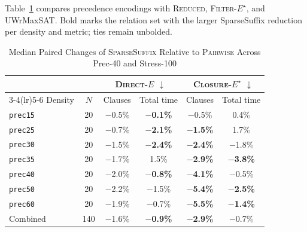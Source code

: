 \documentclass[conference,a4paper]{IEEEtran}
\newcommand{\revised}[1]{#1}
\begin{document}
\revised{Table~\ref{tab:precedence} compares precedence encodings with \mbox{\textsc{Reduced}}, \mbox{\textsc{Filter-}$E^\star$}, and UWrMaxSAT. Bold marks the relation set with the larger SparseSuffix reduction per density and metric; ties remain unbolded.}
\begin{table}[t]
\caption{Median Paired Changes of \mbox{\textnormal{\textsc{SparseSuffix}}} Relative to \mbox{\textnormal{\textsc{Pairwise}}}
Across Prec-40 and Stress-100}
\label{tab:precedence}
\centering
\scriptsize
\setlength{\tabcolsep}{1.3pt}
\begin{tabular}{@{}lccccc@{}}
\toprule
& & \multicolumn{2}{c}{\mbox{\textnormal{\textsc{Direct-}}\ensuremath{E}} $\downarrow$} &
  \multicolumn{2}{c}{\mbox{\textnormal{\textsc{Closure-}}\ensuremath{E^\star}} $\downarrow$} \\
\cmidrule(lr){3-4}\cmidrule(lr){5-6}
Density & $N$ & Clauses & Total time & Clauses & Total time \\
\midrule
\texttt{prec15} & 20 & \ensuremath{-}0.5\% &
  \textbf{\ensuremath{-}0.1\%} &
  \ensuremath{-}0.5\% &
  0.4\% \\
\texttt{prec25} & 20 & \ensuremath{-}0.7\% &
  \textbf{\ensuremath{-}2.1\%} &
  \textbf{\ensuremath{-}1.5\%} &
  1.7\% \\
\texttt{prec30} & 20 & \ensuremath{-}1.5\% &
  \textbf{\ensuremath{-}2.4\%} &
  \textbf{\ensuremath{-}2.4\%} &
  \ensuremath{-}1.8\% \\
\texttt{prec35} & 20 & \ensuremath{-}1.7\% &
  1.5\% &
  \textbf{\ensuremath{-}2.9\%} &
  \textbf{\ensuremath{-}3.8\%} \\
\texttt{prec40} & 20 & \ensuremath{-}2.0\% &
  \textbf{\ensuremath{-}0.8\%} &
  \textbf{\ensuremath{-}4.1\%} &
  \ensuremath{-}0.5\% \\
\texttt{prec50} & 20 & \ensuremath{-}2.2\% &
  \ensuremath{-}1.5\% &
  \textbf{\ensuremath{-}5.4\%} &
  \textbf{\ensuremath{-}2.5\%} \\
\texttt{prec60} & 20 & \ensuremath{-}1.9\% &
  \ensuremath{-}0.7\% &
  \textbf{\ensuremath{-}5.5\%} &
  \textbf{\ensuremath{-}1.4\%} \\
\midrule
Combined & 140 & \ensuremath{-}1.6\% &
  \textbf{\ensuremath{-}0.9\%} &
  \textbf{\ensuremath{-}2.9\%} & \ensuremath{-}0.7\% \\
\bottomrule
\end{tabular}
\end{table}
\end{document}
